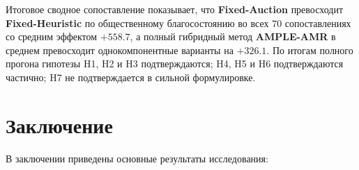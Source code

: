 Итоговое сводное сопоставление показывает, что \textbf{Fixed-Auction}
превосходит \textbf{Fixed-Heuristic} по общественному благосостоянию во всех
$70$ сопоставлениях со средним эффектом $+558.7$, а полный гибридный метод
\textbf{AMPLE-AMR} в среднем превосходит однокомпонентные варианты на
$+326.1$. По итогам полного прогона гипотезы H1, H2 и H3 подтверждаются; H4,
H5 и H6 подтверждаются частично; H7 не подтверждается в сильной формулировке.

\section*{Заключение}

В заключении приведены основные результаты исследования:


\nocite{Tereschenko2026MAVCG}
\nocite{Tereschenko2026AMPLEAMRPrototype}
\nocite{patent_ma_vcg}
